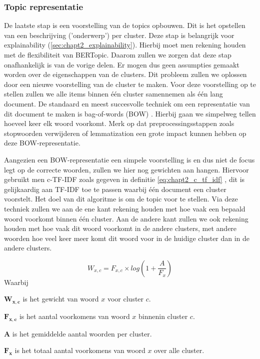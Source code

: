 \subsubsection{Topic representatie}
De laatste stap is een voorstelling van de topics opbouwen. Dit is het opstellen van een beschrijving ('onderwerp') per cluster. Deze stap is belangrijk voor explainability (\autoref{sec:chapt2_explainability}).  Hierbij moet men rekening houden met de flexibiliteit van BERTopic. Daarom zullen we zorgen dat deze stap onafhankelijk is van de vorige delen. Er mogen dus geen assumpties gemaakt worden over de eigenschappen van de clusters. Dit probleem zullen we oplossen door een nieuwe voorstelling van de cluster te maken. Voor deze voorstelling op te stellen zullen we alle items binnen één cluster samennemen als één lang document. De standaard en meest succesvolle techniek om een representatie van dit document te maken is bag-of-words (BOW) \cite{bag_of_words_blog}. Hierbij gaan we simpelweg tellen hoeveel keer elk woord voorkomt. Merk op dat preprocessingsstappen zoals stopwoorden verwijderen of lemmatization een grote impact kunnen hebben op deze BOW-representatie.

Aangezien een BOW-representatie een simpele voorstelling is en dus niet de focus legt op de correcte woorden, zullen we hier nog gewichten aan hangen. Hiervoor gebruikt men c-TF-IDF zoals gegeven in definitie \ref{eq:chapt2_c_tf_idf} \cite{bertopic_algo}, dit is gelijkaardig aan TF-IDF toe te passen waarbij één document een cluster voorstelt. Het doel van dit algoritme is om de topic voor te stellen. Via deze techniek zullen we aan de ene kant rekening houden met hoe vaak een bepaald woord voorkomt binnen één cluster. Aan de andere kant zullen we ook rekening houden met hoe vaak dit woord voorkomt in de andere clusters, met andere woorden hoe veel keer meer komt dit woord voor in de huidige cluster dan in de andere clusters.

\begin{equation}
    W_{x,c} = F_{x,c} \times log(1 + \frac{A}{F_x})
    \label{eq:chapt2_c_tf_idf}
\end{equation}
Waarbij
\begin{description}
    \item$\mathbf{W_{x,c}}$ is het gewicht van woord $x$ voor cluster $c$.
    \item$\mathbf{F_{x,c}}$ is het aantal voorkomens van woord $x$ binnenin cluster $c$.
    \item$\mathbf{A}$ is het gemiddelde aantal woorden per cluster.
    \item$\mathbf{F_{x}}$ is het totaal aantal voorkomens van woord $x$ over alle cluster.
\end{description}

